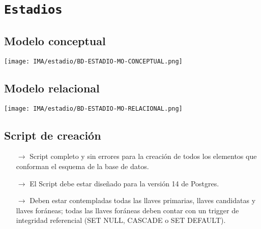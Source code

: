 \section{\texttt{Estadios}}

\subsection{Modelo conceptual}
\begin{center}
    \texttt{[image: IMA/estadio/BD-ESTADIO-MO-CONCEPTUAL.png]}
\end{center}


\subsection{Modelo relacional}
\begin{center}
    \texttt{[image: IMA/estadio/BD-ESTADIO-MO-RELACIONAL.png]}
\end{center}


\subsection{Script de creación}

\begin{itemize}
    \item[$\rightarrow$] Script completo y sin errores para la creación de todos los elementos que conforman el esquema
            de la base de datos.
    \item[$\rightarrow$] El Script debe estar diseñado para la versión 14 de Postgres.
    \item[$\rightarrow$] Deben estar contempladas todas las llaves primarias, llaves candidatas y llaves foráneas;
    todas las llaves foráneas deben contar con un trigger de integridad referencial (SET NULL,
    CASCADE o SET DEFAULT).
\end{itemize}


